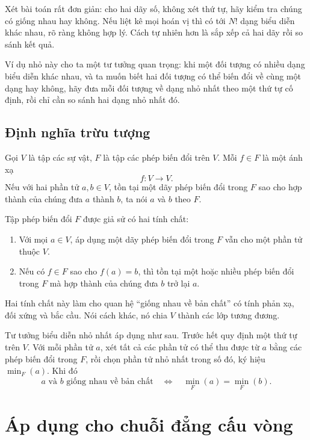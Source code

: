 \documentclass[11pt]{article}
\begin{document}
Xét bài toán rất đơn giản: cho hai dãy số, không xét thứ tự, hãy kiểm tra
chúng có giống nhau hay không. Nếu liệt kê mọi hoán vị thì có tới \(N!\) dạng
biểu diễn khác nhau, rõ ràng không hợp lý. Cách tự nhiên hơn là sắp xếp cả hai
dãy rồi so sánh kết quả.

Ví dụ nhỏ này cho ta một tư tưởng quan trọng: khi một đối tượng có nhiều dạng
biểu diễn khác nhau, và ta muốn biết hai đối tượng có thể biến đổi về cùng
một dạng hay không, hãy đưa mỗi đối tượng về dạng nhỏ nhất theo một thứ tự cố
định, rồi chỉ cần so sánh hai dạng nhỏ nhất đó.

\subsection{Định nghĩa trừu tượng}

Gọi \(V\) là tập các sự vật, \(F\) là tập các phép biến đổi trên \(V\). Mỗi
\(f\in F\) là một ánh xạ
\[
  f:V\to V.
\]
Nếu với hai phần tử \(a,b\in V\), tồn tại một dãy phép biến đổi trong \(F\)
sao cho hợp thành của chúng đưa \(a\) thành \(b\), ta nói \(a\) và \(b\)
 theo \(F\).

Tập phép biến đổi \(F\) được giả sử có hai tính chất:

\begin{enumerate}
  \item Với mọi \(a\in V\), áp dụng một dãy phép biến đổi trong \(F\) vẫn cho
  một phần tử thuộc \(V\).
  \item Nếu có \(f\in F\) sao cho \(f(a)=b\), thì tồn tại một hoặc nhiều phép
  biến đổi trong \(F\) mà hợp thành của chúng đưa \(b\) trở lại \(a\).
\end{enumerate}

Hai tính chất này làm cho quan hệ ``giống nhau về bản chất'' có tính phản xạ,
đối xứng và bắc cầu. Nói cách khác, nó chia \(V\) thành các lớp tương đương.

Tư tưởng biểu diễn nhỏ nhất áp dụng như sau. Trước hết quy định một thứ tự
trên \(V\). Với mỗi phần tử \(a\), xét tất cả các phần tử có thể thu được từ
\(a\) bằng các phép biến đổi trong \(F\), rồi chọn phần tử nhỏ nhất trong số
đó, ký hiệu \(\min_F(a)\). Khi đó
\[
  a \text{ và } b \text{ giống nhau về bản chất}
  \quad\Longleftrightarrow\quad
  \min_F(a)=\min_F(b).
\]

\section{Áp dụng cho chuỗi đẳng cấu vòng}
\end{document}
